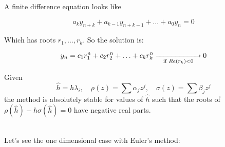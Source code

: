 A finite difference equation looks like

\[
  a_ky_{n+k} + a_{k-1}y_{n+k-1} + \ldots + a_0y_n = 0
\]

Which has roots $r_1,\ldots,r_k$. So the solution is:

\[
  y_n = c_1r_1^n + c_2r_2^n + \ldots + c_kr_k^n \underset{\text{if } Re(r_k)<0}{\xrightarrow{\hspace*{2cm}}} 0
\]

\begin{prop}
    Given $$\hat{h} = h\lambda_i, \quad \rho(z) = \sum\alpha_jz^j, \quad \sigma(z) = \sum\beta_jz^j$$
    the method is absolutely stable for values of $\hat{h}$ such that the roots of $\rho(\hat{h}) - h\sigma(\hat{h}) = 0$ have negative real parts.
\end{prop}
\-\\
Let's see the one dimensional case with Euler's method:

\usetikzlibrary[patterns]

